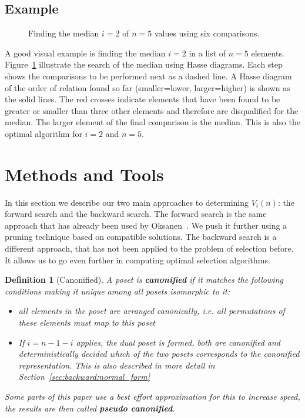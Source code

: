 \documentclass[twoside,leqno,twocolumn]{article}
\newtheorem{definition}{Definition}[section]
\begin{document}
\subsection{Example}
\begin{figure}[!b]
  \centering
  
  \caption{Finding the median $i = 2$ of $n = 5$ values using six comparisons.}
  \label{fig:median_of_5}
\end{figure}
A good visual example is finding the median $i=2$ in a list of $n = 5$ elements.
Figure~\ref{fig:median_of_5} illustrate the search of the median using Hasse diagrams.
Each step shows the comparisons to be performed next as a dashed line.
A Hasse diagram of the order of relation found so far (smaller=lower, larger=higher) is shown as the solid lines.
The red crosses indicate elements that have been found to be greater or smaller than three other elements and therefore are disqualified for the median.
The larger element of the final comparison is the median.
This is also the optimal algorithm for $i = 2$ and $n = 5$.


\section{Methods and Tools}
In this section we describe our two main approaches to determining $V_i(n)$: the forward search and the backward search.
The forward search is the same approach that has already been used by Oksanen~\cite{Oksanen2006}.
We push it further using a pruning technique based on compatible solutions.
The backward search is a different approach, that has not been applied to the problem of selection before.
It allows us to go even further in computing optimal selection algorithms.


\begin{definition}[Canonified]
  A poset is \textbf{canonified} if it matches the following conditions making it unique among all posets isomorphic to it:
  \begin{itemize}
    \item all elements in the poset are arranged canonically, i.e. all permutations of these elements must map to this poset
    \item
          If $i = n - 1 - i$ applies, the dual poset is formed, both are canonified and deterministically decided which of the two posets corresponds to the canonified representation.
          This is also described in more detail in Section~\ref{sec:backward:normal_form}
  \end{itemize}

  Some parts of this paper use a best effort approximation for this to increase speed, the results are then called \textbf{pseudo canonified}.
\end{definition}
\end{document}
